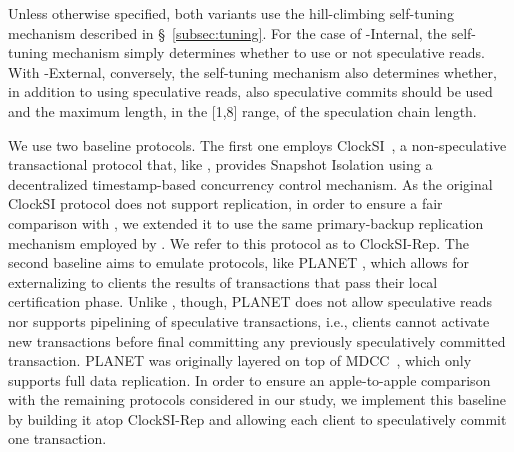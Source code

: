 
Unless otherwise specified, both \specula variants use the hill-climbing self-tuning mechanism described in \S~\ref{subsec:tuning}. For the case of {\specula}-Internal, the self-tuning mechanism simply determines whether to use or not speculative reads. With {\specula}-External, conversely, the self-tuning mechanism also determines whether, in addition to using speculative reads, also speculative commits should be used and the maximum length, in the [1,8] range, of the speculation chain length.


We use two baseline protocols. The first one employs ClockSI~\cite{clocksi}, a non-speculative  transactional protocol that, like \specula, provides Snapshot Isolation using a decentralized timestamp-based concurrency control mechanism. As the original ClockSI protocol does not support replication, in order to ensure a fair comparison with \specula, we extended it to use the same primary-backup replication mechanism employed by \specula. We refer to this protocol as to ClockSI-Rep. The second baseline aims to emulate protocols, like PLANET \cite{pang2014planet}, which allows for externalizing  to clients  the results of transactions that pass their local certification phase. Unlike \specula, though, PLANET does not allow speculative reads nor supports pipelining of speculative transactions, i.e., clients cannot activate new transactions before final committing any previously speculatively committed transaction. PLANET was originally layered on top of MDCC~\cite{kraska2013mdcc}, which only supports full data replication. In order to ensure an apple-to-apple comparison with the remaining protocols considered in our study, we implement this baseline by building it atop ClockSI-Rep and allowing each client to speculatively commit one transaction.

